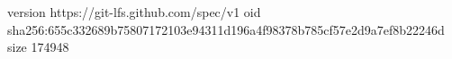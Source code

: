 version https://git-lfs.github.com/spec/v1
oid sha256:655c332689b75807172103e94311d196a4f98378b785cf57e2d9a7ef8b22246d
size 174948

